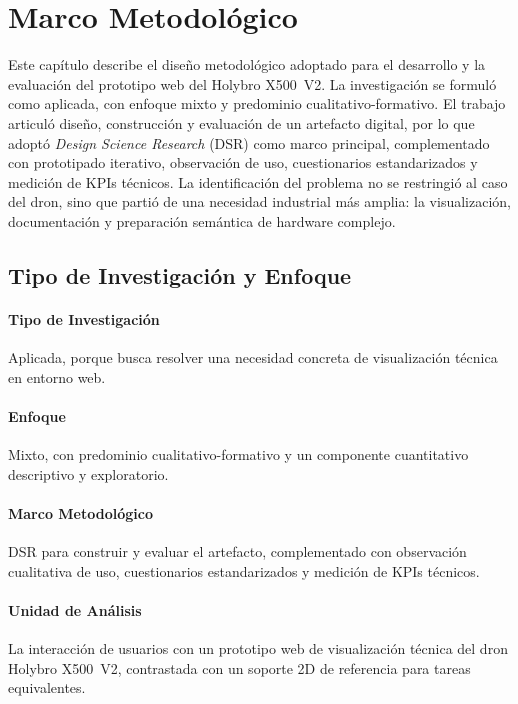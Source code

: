 
\section{Marco Metodológico}

Este capítulo describe el diseño metodológico adoptado para el desarrollo y la evaluación del prototipo web del Holybro X500~V2. La investigación se formuló como aplicada, con enfoque mixto y predominio cualitativo-formativo. El trabajo articuló diseño, construcción y evaluación de un artefacto digital, por lo que adoptó \textit{Design Science Research} (DSR) como marco principal, complementado con prototipado iterativo, observación de uso, cuestionarios estandarizados y medición de KPIs técnicos. La identificación del problema no se restringió al caso del dron, sino que partió de una necesidad industrial más amplia: la visualización, documentación y preparación semántica de hardware complejo.

\subsection{Tipo de Investigación y Enfoque}

\paragraph{Tipo de Investigación} Aplicada, porque busca resolver una necesidad concreta de visualización técnica en entorno web.

\paragraph{Enfoque} Mixto, con predominio cualitativo-formativo y un componente cuantitativo descriptivo y exploratorio.

\paragraph{Marco Metodológico} DSR para construir y evaluar el artefacto, complementado con observación cualitativa de uso, cuestionarios estandarizados y medición de KPIs técnicos.

\paragraph{Unidad de Análisis} La interacción de usuarios con un prototipo web de visualización técnica del dron Holybro X500~V2, contrastada con un soporte 2D de referencia para tareas equivalentes.

